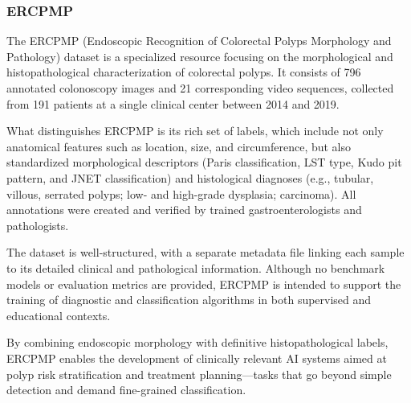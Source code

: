 \subsubsection*{ERCPMP}

The ERCPMP (Endoscopic Recognition of Colorectal Polyps Morphology and Pathology) dataset is a specialized resource focusing on the morphological and histopathological characterization of colorectal polyps. It consists of 796 annotated colonoscopy images and 21 corresponding video sequences, collected from 191 patients at a single clinical center between 2014 and 2019.

What distinguishes ERCPMP is its rich set of labels, which include not only anatomical features such as location, size, and circumference, but also standardized morphological descriptors (Paris classification, LST type, Kudo pit pattern, and JNET classification) and histological diagnoses (e.g., tubular, villous, serrated polyps; low- and high-grade dysplasia; carcinoma). All annotations were created and verified by trained gastroenterologists and pathologists.

The dataset is well-structured, with a separate metadata file linking each sample to its detailed clinical and pathological information. Although no benchmark models or evaluation metrics are provided, ERCPMP is intended to support the training of diagnostic and classification algorithms in both supervised and educational contexts.

By combining endoscopic morphology with definitive histopathological labels, ERCPMP enables the development of clinically relevant AI systems aimed at polyp risk stratification and treatment planning—tasks that go beyond simple detection and demand fine-grained classification.

